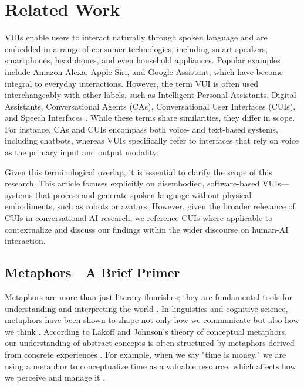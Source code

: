\section{Related Work}
VUIs enable users to interact naturally through spoken language and are embedded in a range of consumer technologies, including smart speakers, smartphones, headphones, and even household appliances. Popular examples include Amazon Alexa, Apple Siri, and Google Assistant, which have become integral to everyday interactions. However, the term VUI is often used interchangeably with other labels, such as Intelligent Personal Assistants, Digital Assistants, Conversational Agents (CAs), Conversational User Interfaces (CUIs), and Speech Interfaces \cite{Clark_Doyle_Garaialde_Gilmartin_Schlögl_Edlund_Aylett_Cabral_Munteanu_Edwards_et_al._2019}. While these terms share similarities, they differ in scope. For instance, CAs and CUIs encompass both voice- and text-based systems, including chatbots, whereas VUIs specifically refer to interfaces that rely on voice as the primary input and output modality.

Given this terminological overlap, it is essential to clarify the scope of this research. This article focuses explicitly on disembodied, software-based VUIs—systems that process and generate spoken language without physical embodiments, such as robots or avatars. However, given the broader relevance of CUIs in conversational AI research, we reference CUIs where applicable to contextualize and discuss our findings within the wider discourse on human-AI interaction.

\subsection{Metaphors—A Brief Primer}



Metaphors are more than just literary flourishes; they are fundamental tools for understanding and interpreting the world \cite{Indurkhya_2013}. In linguistics and cognitive science, metaphors have been shown to shape not only how we communicate but also how we think \cite{Gentner_Hoyos_2017}. According to Lakoff and Johnson's theory of conceptual metaphors, our understanding of abstract concepts is often structured by metaphors derived from concrete experiences \cite{Lakoff_Johnson_1980}. For example, when we say "time is money," we are using a metaphor to conceptualize time as a valuable resource, which affects how we perceive and manage it \cite{Lakoff_Johnson_1980}.

